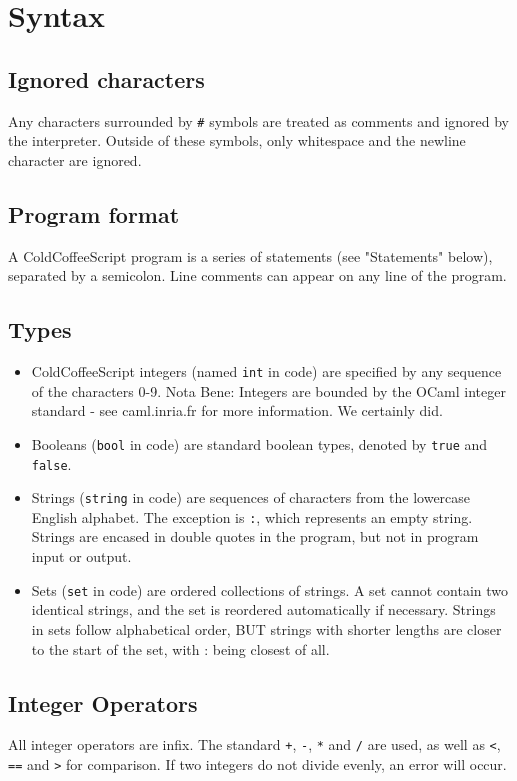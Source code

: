 \documentclass{article}
\begin{document}
\section{Syntax}
\subsection{Ignored characters}
Any characters surrounded by \lstinline|#| symbols are treated as comments and ignored by the interpreter. Outside of these symbols, only whitespace and the newline character are ignored.
\subsection{Program format}
A ColdCoffeeScript program is a series of statements (see "Statements" below), separated by a semicolon. Line comments can appear on any line of the program.
\subsection{Types}
\begin{itemize}
\item ColdCoffeeScript integers (named \lstinline|int| in code) are specified by any sequence of the characters 0-9. Nota Bene: Integers are bounded by the OCaml integer standard - see caml.inria.fr for more information. We certainly did.
\item Booleans (\lstinline|bool| in code) are standard boolean types, denoted by \lstinline|true| and \lstinline|false|.
\item Strings (\lstinline|string| in code) are sequences of characters from the lowercase English alphabet. The exception is \lstinline|:|, which represents an empty string. Strings are encased in double quotes in the program, but not in program input or output.
\item Sets (\lstinline|set| in code) are ordered collections of strings. A set cannot contain two identical strings, and the set is reordered automatically if necessary. Strings in sets follow alphabetical order, BUT strings with shorter lengths are closer to the start of the set, with : being closest of all.
\end{itemize}
\subsection{Integer Operators}
All integer operators are infix. The standard \lstinline|+|, \lstinline|-|, \lstinline|*| and \lstinline|/| are used, as well as \lstinline|<|, \lstinline|==| and \lstinline|>| for comparison. If two integers do not divide evenly, an error will occur.\\
\end{document}
